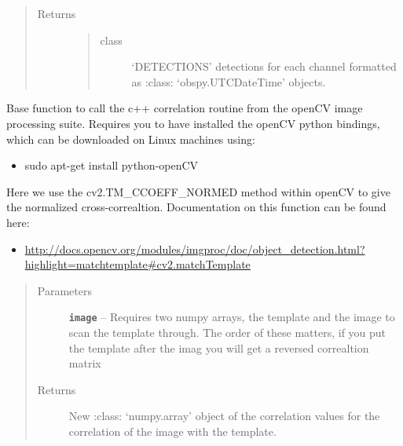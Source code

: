 \documentclass[a4paper,10pt,english]{sphinxmanual}
\begin{document}
\begin{fulllineitems}
\begin{quote}
\begin{description}
\item[{Returns}] \leavevmode
\begin{quote}\begin{description}
\item[{class}] \leavevmode
`DETECTIONS' detections for each channel formatted as    :class: `obspy.UTCDateTime' objects.

\end{description}\end{quote}


\end{description}\end{quote}

\end{fulllineitems}


\begin{fulllineitems}
\label{core:match_filter.normxcorr2}
Base function to call the c++ correlation routine from the openCV image
processing suite.  Requires you to have installed the openCV python
bindings, which can be downloaded on Linux machines using:
\begin{itemize}
\item {} 
sudo apt-get install python-openCV

\end{itemize}

Here we use the cv2.TM\_CCOEFF\_NORMED method within openCV to give the
normalized cross-correaltion.  Documentation on this function can be
found here:
\begin{itemize}
\item {} 
\href{http://docs.opencv.org/modules/imgproc/doc/object\_detection.html?highlight=matchtemplate\#cv2.matchTemplate}{http://docs.opencv.org/modules/imgproc/doc/object\_detection.html?highlight=matchtemplate\#cv2.matchTemplate}

\end{itemize}
\begin{quote}\begin{description}
\item[{Parameters}] \leavevmode
\textbf{\texttt{image}} -- Requires two numpy arrays, the template and the image to scan    the template through.  The order of these matters, if you put the template    after the imag you will get a reversed correaltion matrix

\item[{Returns}] \leavevmode
New :class: `numpy.array' object of the correlation values for the    correlation of the image with the template.

\end{description}\end{quote}

\end{fulllineitems}
\end{document}
